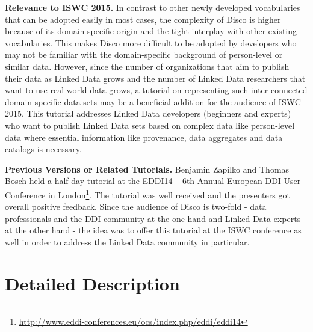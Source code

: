 \documentclass{llncs}
\begin{document}
\textbf{Relevance to ISWC 2015.}
In contrast to other newly developed vocabularies that can be adopted easily in most cases, the complexity of Disco is higher because of its domain-specific origin and the tight interplay with other existing vocabularies. This makes Disco more difficult to be adopted by developers who may not be familiar with the domain-specific background of person-level or similar data. However, since the number of organizations that aim to publish their data as Linked Data grows and the number of Linked Data researchers that want to use real-world data grows, a tutorial on representing such inter-connected domain-specific data sets may be a beneficial addition for the audience of ISWC 2015.
This tutorial addresses Linked Data developers (beginners and experts) who want to publish Linked Data sets based on complex data like person-level data where essential information like provenance, data aggregates and data catalogs is necessary.

\textbf{Previous Versions or Related Tutorials.}
Benjamin Zapilko and Thomas Bosch held a half-day tutorial at the EDDI14 – 6th Annual European DDI User Conference in London\footnote{\url{http://www.eddi-conferences.eu/ocs/index.php/eddi/eddi14}}.
The tutorial was well received and the presenters got overall positive feedback. Since the audience of Disco is two-fold - data professionals and the DDI community at the one hand and Linked Data experts at the other hand - the idea was to offer this tutorial at the ISWC conference as well in order to address the Linked Data community in particular.

\section{Detailed Description}
\end{document}
